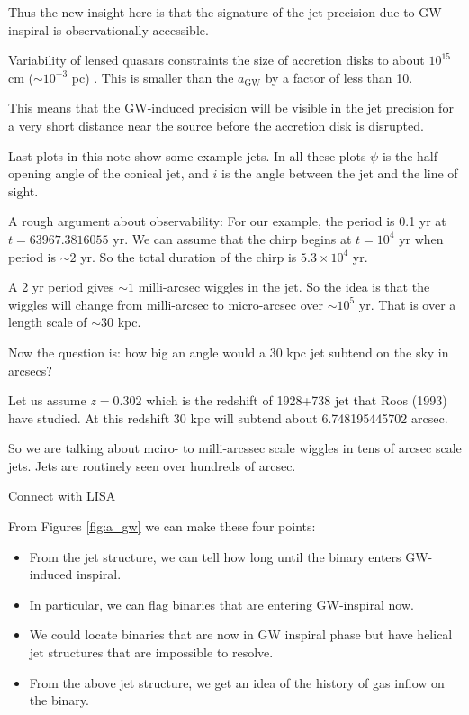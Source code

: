Thus the new insight here is that the signature of the jet precision
due to GW-inspiral is observationally accessible. 

Variability of lensed quasars constraints the size of accretion disks
to about $10^{15}$ cm ($\sim 10^{-3}$ pc) \citep{2010ApJ...712.1129M}.
This is smaller than the $a_\mathrm{GW}$ by a factor of less than 10.

This means that the GW-induced precision will be visible in the jet
precision for a very short distance near the source before the
accretion disk is disrupted.

Last plots in this note show some example jets.  In all these plots
$\psi$ is the half-opening angle of the conical jet, and $i$ is the
angle between the jet and the line of sight.

A rough argument about observability: For our example, the period is
0.1 yr at $t = 63967.3816055$ yr.  We can assume that the chirp begins
at $t = 10^4$ yr when period is $\sim 2$ yr.  So the total duration of
the chirp is $5.3\times 10^4$ yr.

A 2 yr period gives $\sim 1$ milli-arcsec wiggles in the jet.  So the
idea is that the wiggles will change from milli-arcsec to micro-arcsec
over $\sim 10^5$ yr.  That is over a length scale of $\sim 30$ kpc.

Now the question is: how big an angle would a 30 kpc jet subtend on
the sky in arcsecs?

Let us assume $z = 0.302$ which is the redshift of 1928+738 jet that
Roos (1993) have studied.  At this redshift 30 kpc will subtend about
6.748195445702 arcsec.

So we are talking about mciro- to milli-arcssec scale wiggles in tens
of arcsec scale jets.  Jets are routinely seen over hundreds of
arcsec.

Connect with LISA


From Figures \ref{fig:a_gw} we can make these four points:

\begin{itemize}
\item From the jet structure, we can tell how long until the binary enters GW-induced inspiral.
\item In particular, we can flag binaries that are entering GW-inspiral now.
\item We could locate binaries that are now in GW inspiral phase but
  have helical jet structures that are impossible to resolve.
\item From the above jet structure, we get an idea of the history of gas inflow on the binary.
\end{itemize}

